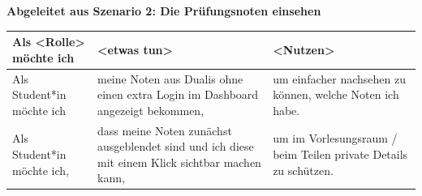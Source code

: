 \documentclass[a4paper,11pt]{scrartcl}
\begin{document}
\noindent\textbf{Abgeleitet aus Szenario 2: Die Prüfungsnoten einsehen} \par\noindent
\begin{table}[H]
\begin{tabular}{|p{4.5cm}|p{5cm}|p{5cm}|}
\hline
\textbf{Als <Rolle> möchte ich} &\textbf{ <etwas tun>} &\textbf{ <Nutzen>} \\ \hline
Als Student*in möchte ich & meine Noten aus Dualis ohne einen extra Login im Dashboard angezeigt bekommen, &  um einfacher nachsehen zu können, welche Noten ich habe. \\ \hline
Als Student*in möchte ich, & dass meine Noten zunächst ausgeblendet sind und ich diese mit einem Klick sichtbar machen kann, &  um im Vorlesungsraum / beim Teilen private Details zu schützen.  \\ \hline
\end{tabular}
\end{table}
\end{document}
